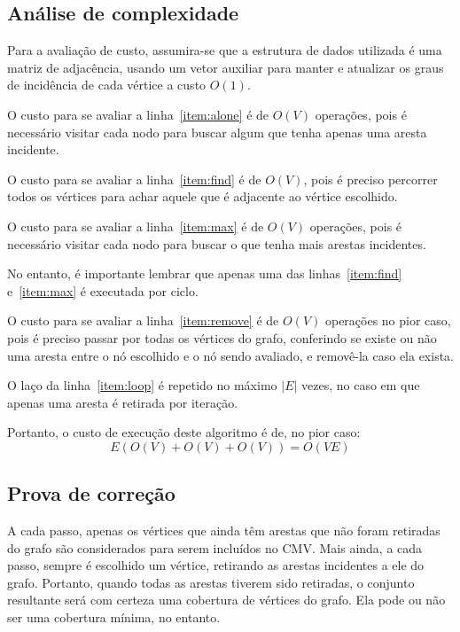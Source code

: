 \subsection{Análise de complexidade}
Para a avaliação de custo, assumira-se que a estrutura de dados
utilizada é uma matriz de adjacência, usando um vetor auxiliar para
manter e atualizar os graus de incidência de cada vértice a custo
$O(1)$.

O custo para se avaliar a linha~\ref{item:alone} é de $O(V)$
operações, pois é necessário visitar cada nodo para buscar algum que
tenha apenas uma aresta incidente.

O custo para se avaliar a linha~\ref{item:find} é de $O(V)$, pois é
preciso percorrer todos os vértices para achar aquele que é adjacente
ao vértice escolhido.

O custo para se avaliar a linha~\ref{item:max} é de $O(V)$
operações, pois é necessário visitar cada nodo para buscar o que tenha
mais arestas incidentes.

No entanto, é importante lembrar que apenas uma das
linhas~\ref{item:find} e~\ref{item:max} é executada por ciclo.

O custo para se avaliar a linha~\ref{item:remove} é de $O(V)$
operações no pior caso, pois é preciso passar por todas os vértices do
grafo, conferindo se existe ou não uma aresta entre o nó escolhido e
o nó sendo avaliado, e removê-la caso ela exista.

O laço da linha~\ref{item:loop} é repetido no máximo $\left| E
\right|$ vezes, no caso em que apenas uma aresta é retirada por
iteração.

Portanto, o custo de execução deste algoritmo é de, no pior caso:
$$E(O(V) + O(V) + O(V)) = O(VE)$$

\subsection{Prova de correção}
A cada passo, apenas os vértices que ainda têm arestas que não foram
retiradas do grafo são considerados para serem incluídos no CMV. Mais
ainda, a cada passo, sempre é escolhido um vértice, retirando as
arestas incidentes a ele do grafo. Portanto, quando todas as arestas
tiverem sido retiradas, o conjunto resultante será com certeza uma
cobertura de vértices do grafo. Ela pode ou não ser uma cobertura
mínima, no entanto.
